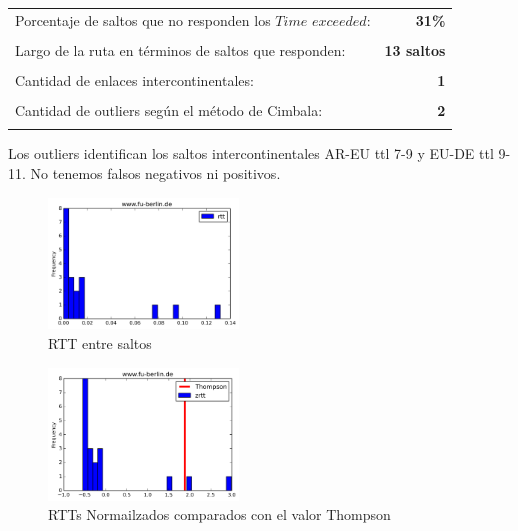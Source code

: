 \begin{center}
\begin{tabular}{p{6.5cm}r}
Porcentaje de saltos que no responden los $Time$ $exceeded$: & \textbf{31\%} \\ \\ 
Largo de la ruta en términos de saltos que responden: &\textbf{13 saltos} \\ \\
Cantidad de enlaces intercontinentales: & \textbf{1} \\ \\
Cantidad de outliers según el método de Cimbala: & \textbf{2} \\ \\
\end{tabular}
\end{center}

Los outliers identifican los saltos intercontinentales AR-EU ttl 7-9 y EU-DE ttl 9-11. No tenemos falsos negativos ni positivos.

\begin{figure}[H]
  \centering
    \includegraphics[width=0.45\textwidth]{histogramas_rtt/www-fu-berlin-de.png}
  \caption{RTT entre saltos}
  \label{entropia-s}
\end{figure}

\begin{center}

\end{center}

\begin{figure}[H]
  \centering
    \includegraphics[width=0.45\textwidth]{histogramas_thompson/www-fu-berlin-de.png}
  \caption{RTTs Normailzados comparados con el valor Thompson}
  \label{entropia-s}
\end{figure}

